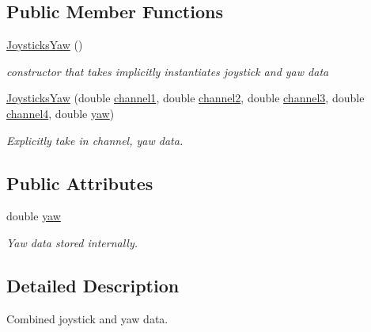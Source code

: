 \subsection*{Public Member Functions}
\begin{DoxyCompactItemize}
\item 
\hyperlink{structJoysticksYaw_a1a5b1cf8d91d31c8aa7fb63acfc5833c}{Joysticks\-Yaw} ()
\begin{DoxyCompactList}\small\item\em constructor that takes implicitly instantiates joystick and yaw data \end{DoxyCompactList}\item 
\hyperlink{structJoysticksYaw_a01b433c411a2071821fded99f9f17a2b}{Joysticks\-Yaw} (double \hyperlink{structJoysticks_a3dc64d66808dddbf053033465777c493}{channel1}, double \hyperlink{structJoysticks_a14f4be76749f40ea8d75d579504ef932}{channel2}, double \hyperlink{structJoysticks_a2640f7dbb2364b8d92c464077c38ec56}{channel3}, double \hyperlink{structJoysticks_a154d66609cbfcb527d4dcf7473bf7af5}{channel4}, double \hyperlink{structJoysticksYaw_aed456b5f37609c1b68843ccf1e29019a}{yaw})
\begin{DoxyCompactList}\small\item\em Explicitly take in channel, yaw data. \end{DoxyCompactList}\end{DoxyCompactItemize}
\subsection*{Public Attributes}
\begin{DoxyCompactItemize}
\item 
double \hyperlink{structJoysticksYaw_aed456b5f37609c1b68843ccf1e29019a}{yaw}
\begin{DoxyCompactList}\small\item\em Yaw data stored internally. \end{DoxyCompactList}\end{DoxyCompactItemize}


\subsection{Detailed Description}
Combined joystick and yaw data. 

